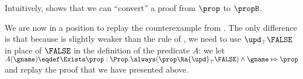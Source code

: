 Intuitively,  shows that we can ``convert'' a proof from $\prop$ to $\propB$.

We are now in a position to replay the counterexample from .
The only difference is that because  is slightly weaker than the rule  of , we need to use ${\upd}_\top \FALSE$ in place of $\FALSE$ in the definition of the predicate $A$:
we let \(
  A(\gname) \eqdef \Exists \prop : \Prop. \always (\prop \Ra {\upd}_\top \FALSE) \land \gname \Mapsto \prop\)
and replay the proof that we have presented above.


